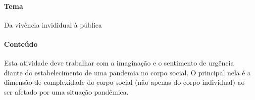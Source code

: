 \documentclass[12pt]{extarticle}
\begin{document}

\paragraph{Tema} Da vivência invididual à pública

\paragraph{Conteúdo}

Esta atividade deve trabalhar com a imaginação e o sentimento de
urgência diante do estabelecimento de uma pandemia no corpo social. O
principal nela é a dimensão de complexidade do corpo social (não apenas
do corpo individual) ao ser afetado por uma situação pandêmica.
\end{document}
